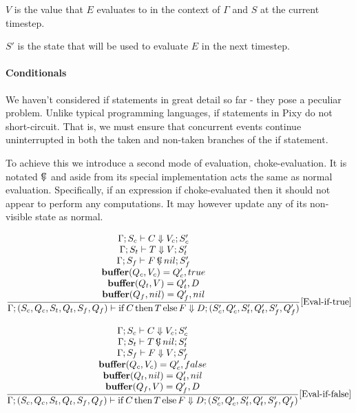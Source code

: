 \documentclass{scrartcl}
\DeclareMathOperator{\ifop}{if}
\DeclareMathOperator{\thenop}{then}
\DeclareMathOperator{\elseop}{else}
\DeclareMathOperator{\ceval}{\overset{C}{\smash{\Downarrow}}}
\DeclareMathOperator{\buffer}{\mathbf{buffer}}
\begin{document}
    $V$ is the value that $E$ evaluates to in the context of $\Gamma$ and $S$ at the current timestep.
    
    $S'$ is the state that will be used to evaluate $E$ in the next timestep.
    
    \paragraph{Conditionals}
    
    We haven't considered if statements in great detail so far - they pose a peculiar problem. Unlike typical programming languages, if statements in Pixy do not short-circuit. That is, we must ensure that concurrent events continue uninterrupted in both the taken and non-taken branches of the if statement.
    
    To achieve this we introduce a second mode of evaluation, choke-evaluation. It is notated $\ceval$ and aside from its special implementation acts the same as normal evaluation. Specifically, if an expression if choke-evaluated then it should not appear to perform any computations. It may however update any of its non-visible state as normal.
    
    \begin{align*}
    \frac{
        \begin{matrix}
        \Gamma; S_c \vdash C \Downarrow V_c; S_c' \\
        \Gamma; S_t \vdash T \Downarrow V; S_t' \\
        \Gamma; S_f \vdash F \ceval nil; S_f' \\
        \buffer(Q_c, V_c) = Q_c', true \\
        \buffer(Q_t, V) = Q_t', D \\
        \buffer(Q_f, nil) = Q_f', nil 
        \end{matrix}
    }{
        \Gamma; (S_c, Q_c, S_t, Q_t, S_f, Q_f) \vdash \ifop C \thenop T \elseop F \Downarrow D; (S_c', Q_c', S_t', Q_t', S_f', Q_f')
    }[\text{Eval-if-true}]
    \end{align*}
    
    \begin{align*}
    \frac{
        \begin{matrix}
        \Gamma; S_c \vdash C \Downarrow V_c; S_c' \\
        \Gamma; S_t \vdash T \ceval nil; S_t' \\
        \Gamma; S_f \vdash F \Downarrow V; S_f' \\
        \buffer(Q_c, V_c) = Q_c', false \\
        \buffer(Q_t, nil) = Q_t', nil \\
        \buffer(Q_f, V) = Q_f', D
        \end{matrix}
    }{
        \Gamma; (S_c, Q_c, S_t, Q_t, S_f, Q_f) \vdash \ifop C \thenop T \elseop F \Downarrow D; (S_c', Q_c', S_t', Q_t', S_f', Q_f')
    }[\text{Eval-if-false}]
    \end{align*}
    
\end{document}
